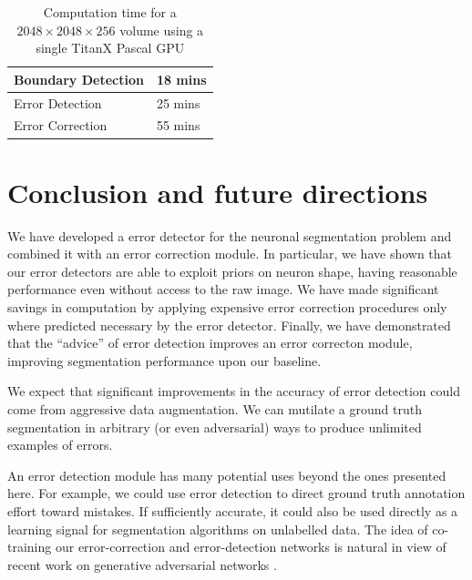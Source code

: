 \documentclass{article}
\begin{document}
\begin{table}[h]
	\caption{Computation time for a $2048\times 2048\times 256$ volume using a single TitanX Pascal GPU}
\label{table:timing}
  \centering
  \begin{tabular}{ll}
	  \toprule
	Boundary Detection & 18 mins\\
	\midrule
	Error Detection & 25 mins\\
	\midrule
	Error Correction & 55 mins\\
	\bottomrule
  \end{tabular}
\end{table}

\section{Conclusion and future directions}
We have developed a error detector for the neuronal segmentation problem and combined it with an error correction module. In particular, we have shown that our error detectors are able to exploit priors on neuron shape, having reasonable performance even without access to the raw image. We have made significant savings in computation by applying expensive error correction procedures only where predicted necessary by the error detector. Finally, we have demonstrated that the ``advice'' of error detection improves an error correcton module, improving segmentation performance upon our baseline.

We expect that significant improvements in the accuracy of error detection could come from aggressive data augmentation. We can mutilate a ground truth segmentation in arbitrary (or even adversarial) ways to produce unlimited examples of errors.

An error detection module has many potential uses beyond the ones presented here. For example, we could use error detection to direct ground truth annotation effort toward mistakes. If sufficiently accurate, it could also be used directly as a learning signal for segmentation algorithms on unlabelled data. The idea of co-training our error-correction and error-detection networks is natural in view of recent work on generative adversarial networks \cite{cgan1,cgan2}.

\end{document}
